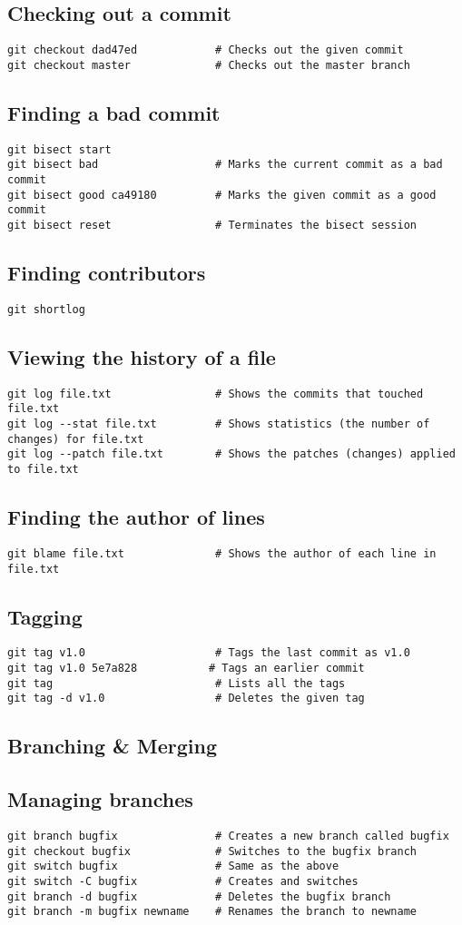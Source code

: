 \documentclass[a4paper,10pt]{article}
\newcommand{\sectiontitle}[1]{%
    \begin{center}
        \section*{#1}
    \end{center}
    \vspace{-0.5em}
}
\newcommand{\subsectiontitle}[1]{\subsection*{#1}\vspace{-0.3em}}
\begin{document}
\subsectiontitle{Checking out a commit}
\begin{verbatim}
git checkout dad47ed            # Checks out the given commit
git checkout master             # Checks out the master branch
\end{verbatim}

\subsectiontitle{Finding a bad commit}
\begin{verbatim}
git bisect start
git bisect bad                  # Marks the current commit as a bad commit
git bisect good ca49180         # Marks the given commit as a good commit
git bisect reset                # Terminates the bisect session
\end{verbatim}

\subsectiontitle{Finding contributors}
\begin{verbatim}
git shortlog
\end{verbatim}

\subsectiontitle{Viewing the history of a file}
\begin{verbatim}
git log file.txt                # Shows the commits that touched file.txt
git log --stat file.txt         # Shows statistics (the number of changes) for file.txt
git log --patch file.txt        # Shows the patches (changes) applied to file.txt
\end{verbatim}

\subsectiontitle{Finding the author of lines}
\begin{verbatim}
git blame file.txt              # Shows the author of each line in file.txt
\end{verbatim}

\subsectiontitle{Tagging}
\begin{verbatim}
git tag v1.0                    # Tags the last commit as v1.0
git tag v1.0 5e7a828           # Tags an earlier commit
git tag                         # Lists all the tags
git tag -d v1.0                 # Deletes the given tag
\end{verbatim}
\newpage

\sectiontitle{Branching \& Merging}
\subsectiontitle{Managing branches}
\begin{verbatim}
git branch bugfix               # Creates a new branch called bugfix
git checkout bugfix             # Switches to the bugfix branch
git switch bugfix               # Same as the above
git switch -C bugfix            # Creates and switches
git branch -d bugfix            # Deletes the bugfix branch
git branch -m bugfix newname    # Renames the branch to newname
\end{verbatim}
\end{document}
